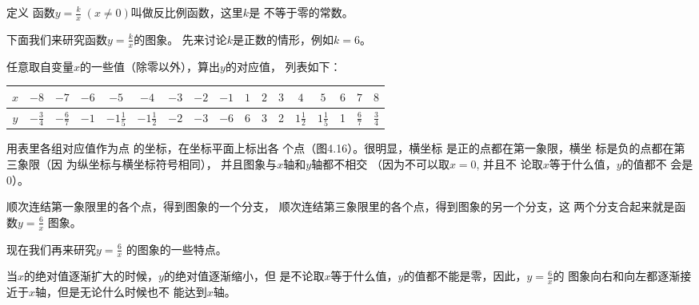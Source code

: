 \begin{blk}{定义}
函数$y=\frac{k}{x}\; (x\ne 0)$叫做反比例函数，这里$k$是
不等于零的常数。
\end{blk}

下面我们来研究函数$y=\frac{k}{x}$的图象。
先来讨论$k$是正数的情形，例如$k=6$。

任意取自变量$x$的一些值（除零以外），算出$y$的对应值，
列表如下：
\begin{center}
\begin{tabular}{c|cccccccccccccccc}
\hline
$x$ & $-8$   &    $-7$   &    $-6$   &    $-5$   &    $-4$   &    $-3$   &    $-2$   &    $-1$   &    $1$   &    $2$   &    $3$   &    $4$   &    $5$   &    $6$   &    $7$   &    $8$\\
\hline
$y$ &$-\frac{3}{4}$&$-\frac{6}{7}$&$-1$&$-1\frac{1}{5}$&$-1\frac{1}{2}$&$-2$&$-3$&$-6$&6&3&2&$1\frac{1}{2}$&$1\frac{1}{5}$&1&$\frac{6}{7}$&$\frac{3}{4}$\\
\hline
\end{tabular}
\end{center}

\begin{figure}[htp]
    \centering
{}
    \caption{}
\end{figure}

用表里各组对应值作为点
的坐标，在坐标平面上标出各
个点（图4.16）。很明显，横坐标
是正的点都在第一象限，横坐
标是负的点都在第三象限（因
为纵坐标与横坐标符号相同），
并且图象与$x$轴和$y$轴都不相交
（因为不可以取$x=0$, 并且不
论取$x$等于什么值，$y$的值都不
会是0）。



顺次连结第一象限里的各个点，得到图象的一个分支，
顺次连结第三象限里的各个点，得到图象的另一个分支，这
两个分支合起来就是函数$y=\frac{6}{x}$
图象。

现在我们再来研究$y=\frac{6}{x}$
的图象的一些特点。

当$x$的绝对值逐渐扩大的时候，$y$的绝对值逐渐缩小，但
是不论取$x$等于什么值，$y$的值都不能是零，因此，$y=\frac{6}{x}$的
图象向右和向左都逐渐接近于$x$轴，但是无论什么时候也不
能达到$x$轴。

